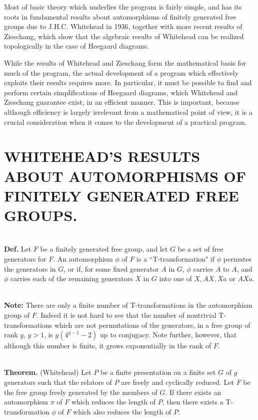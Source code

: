 \documentclass[12pt]{amsart}
\newcommand{\definition}{\ \\ \noindent \textbf{Def.} }
\newcommand{\note}{\ \\ \noindent  \textbf{Note:} }
\newcommand{\theorem}{\ \\ \noindent  \textbf{Theorem.} }
\begin{document}
                                                        
                Most of basic theory which underlies the program is fairly simple, and has its roots
        in fundamental results about automorphisms of finitely generated free groups due to J.H.C.
        Whitehead in 1936, together with more recent results of Zieschang, which show that the
        algebraic results of Whitehead can be realized topologically in the case of Heegaard
        diagrams.

                While the results of Whitehead and Zieschang form the mathematical basis for
        much of the program, the actual development of a program which effectively exploits
        their results requires more. In particular, it must be possible to find and perform
        certain simplifications of Heegaard diagrams, which Whitehead and Zieschang guarantee
        exist, in an efficient manner. This is important, because although efficiency is largely
        irrelevant from a mathematical point of view, it is a crucial consideration when it comes
        to the development of a practical program.
        
        
\section{WHITEHEAD'S RESULTS ABOUT AUTOMORPHISMS OF FINITELY GENERATED FREE GROUPS.}
                        
        
\definition     Let $F$ be a finitely generated free group, and let $G$ be a set of free generators for
        $F$. An automorphism $\phi$ of $F$ is a ``T-transformation" if $\phi$ permutes the generators in $G$, or
        if, for some fixed generator $A$ in $G$, $\phi$ carries $A$ to $A$, and $\phi$ carries each of the
        remaining generators $X$ in $G$ into one of $X, AX, Xa$ or $AXa$.
        
\note   There are only a finite number of T-transformations in the automorphism group of $F$.
        Indeed it is not hard to see that the number of nontrivial T-transformations which are
        not permutations of the generators, in a free group of rank $g$, $g > 1$, is $g(4^{g-1}-2)$
        up to conjugacy. Note further, however, that although this number is finite, it grows
        exponentially in the rank of $F$.       
        
\theorem(Whitehead) Let $P$ be a finite presentation on a finite set $G$ of $g$ generators such
        that the relators of $P$ are freely and cyclically reduced. Let $F$ be the free group freely
        generated by the members of $G$. If there exists an automorphism $\pi$  of $F$ which reduces the
        length of $P$, then there exists a T-transformation $\phi$ of $F$ which also reduces the length
        of $P$.
\end{document}
